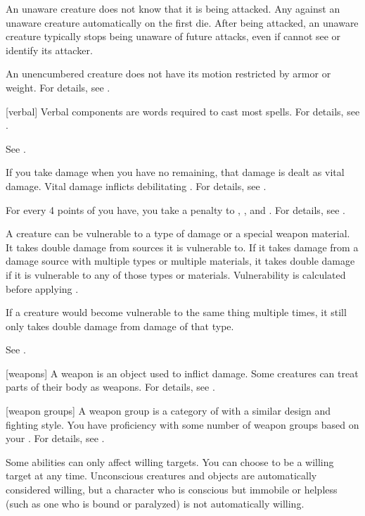  An unaware creature does not know that it is being attacked.
Any  against an unaware creature automatically  on the first die.
After being attacked, an unaware creature typically stops being unaware of future attacks, even if cannot see or identify its attacker.

 An unencumbered creature does not have its motion restricted by armor or weight. For details, see .

[verbal] Verbal components are words required to cast most spells.
For details, see .

 See .

 If you take damage when you have no  remaining, that damage is dealt as vital damage.
Vital damage inflicts debilitating .
For details, see .

 For every 4 points of  you have, you take a  penalty to , , and .
For details, see .

 A creature can be vulnerable to a type of damage or a special weapon material.
It takes double damage from sources it is vulnerable to.
If it takes damage from a damage source with multiple types or multiple materials, it takes double damage if it is vulnerable to any of those types or materials.
Vulnerability is calculated before applying .
\par If a creature would become vulnerable to the same thing multiple times, it still only takes double damage from damage of that type.

 See .

[weapons] A weapon is an object used to inflict damage.
Some creatures can treat parts of their body as weapons.
For details, see .

[weapon groups] A weapon group is a category of  with a similar design and fighting style.
You have proficiency with some number of weapon groups based on your .
For details, see .

 Some abilities can only affect willing targets. You can choose to be a willing target at any time. Unconscious creatures and objects are automatically considered willing, but a character who is conscious but immobile or helpless (such as one who is bound or paralyzed) is not automatically willing.

